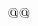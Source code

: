 $$\def\UseAMSsymbols{\relax}
\def\Bbb{\RIfM@\expandafter\Bbb@\else
 \expandafter\nonmatherr@\expandafter\Bbb\fi}
\def\Bbb@#1{{\Bbb@@{#1}}}
\def\Bbb@@#1{\noaccents@\fam\msbfam\relax#1}
\def\loadeufm{\eufmloaded@true
 \font@\teneufm=eufm10
 \font@\seveneufm=eufm7
 \font@\fiveeufm=eufm5
 \alloc@@8\fam\chardef\sixt@@n\eufmfam
 \textfont\eufmfam=\teneufm
 \scriptfont\eufmfam=\seveneufm
 \scriptscriptfont\eufmfam=\fiveeufm}
\def\frak{\RIfM@\expandafter\frak@\else
 \expandafter\nonmatherr@\expandafter\frak\fi}
\def\frak@#1{{\frak@@{#1}}}
\def\frak@@#1{\fam\eufmfam\relax#1}
\let\goth\frak
\newif\ifcmmibloaded@
\newif\ifcmbsyloaded@
\def\loadbold{\cmmibloaded@true\cmbsyloaded@true
 \font@\tencmmib=cmmib10 \font@\sevencmmib=cmmib7 \font@\fivecmmib=cmmib5
 \skewchar\tencmmib='177 \skewchar\sevencmmib='177 \skewchar\fivecmmib='177
 \alloc@@8\fam\chardef\sixt@@n\cmmibfam
 \textfont\cmmibfam=\tencmmib
 \scriptfont\cmmibfam=\sevencmmib
 \scriptscriptfont\cmmibfam=\fivecmmib
 \edef\cmmibfam@{\hexnumber@\cmmibfam}%
 \font@\tencmbsy=cmbsy10 \font@\sevencmbsy=cmbsy7 \font@\fivecmbsy=cmbsy5
 \skewchar\tencmbsy='60 \skewchar\sevencmbsy='60 \skewchar\fivecmbsy='60
 \alloc@@8\fam\chardef\sixt@@n\cmbsyfam
 \textfont\cmbsyfam=\tencmbsy
 \scriptfont\cmbsyfam=\sevencmbsy
 \scriptscriptfont\cmbsyfam=\fivecmbsy
 \edef\cmbsyfam@{\hexnumber@\cmbsyfam}}
\def\mathchari@#1#2#3{\ifcmmibloaded@\mathchar"#1\cmmibfam@#2#3 \else
 \Err@{First bold symbol font not loaded}\fi}
\def\mathcharii@#1#2#3{\ifcmbsyloaded@\mathchar"#1\cmbsyfam@#2#3 \else
 \Err@{Second bold symbol font not loaded}\fi}
\def\boldkey#1{\ifcat\noexpand#1A%
  \ifcmmibloaded@{\fam\cmmibfam#1}\else
   \Err@{First bold symbol font not loaded}\fi
 \else
 \ifx#1!\mathchar"5\bffam@21 \else
 \ifx#1(\mathchar"4\bffam@28 \else\ifx#1)\mathchar"5\bffam@29 \else
 \ifx#1+\mathchar"2\bffam@2B \else\ifx#1:\mathchar"3\bffam@3A \else
 \ifx#1;\mathchar"6\bffam@3B \else\ifx#1=\mathchar"3\bffam@3D \else
 \ifx#1?\mathchar"5\bffam@3F \else\ifx#1[\mathchar"4\bffam@5B \else
 \ifx#1]\mathchar"5\bffam@5D \else
 \ifx#1,\mathchari@63B \else
 \ifx#1-\mathcharii@200 \else
 \ifx#1.\mathchari@03A \else
 \ifx#1/\mathchari@03D \else
 \ifx#1<\mathchari@33C \else
 \ifx#1>\mathchari@33E \else
 \ifx#1*\mathcharii@203 \else
 \ifx#1|\mathcharii@06A \else
 \ifx#10\bold0\else\ifx#11\bold1\else\ifx#12\bold2\else\ifx#13\bold3\else
 \ifx#14\bold4\else\ifx#15\bold5\else\ifx#16\bold6\else\ifx#17\bold7\else
 \ifx#18\bold8\else\ifx#19\bold9\else
  \Err@{\string\boldkey\space can't be used with #1}%
 \fi\fi\fi\fi\fi\fi\fi\fi\fi\fi\fi\fi\fi\fi\fi
 \fi\fi\fi\fi\fi\fi\fi\fi\fi\fi\fi\fi\fi\fi}
$$

